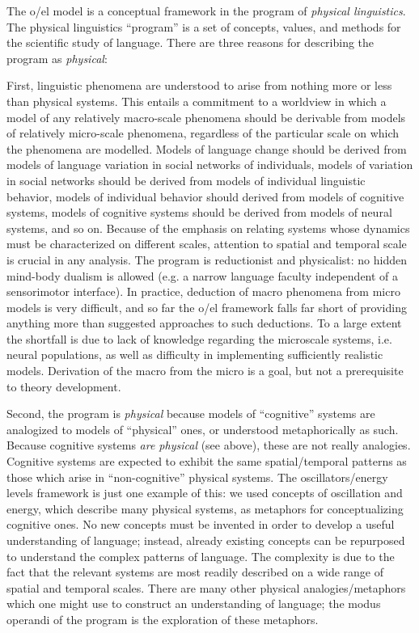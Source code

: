 The o/el model is a conceptual framework in the program of \textit{physical linguistics}. The physical linguistics “program” is a set of concepts, values, and methods for the scientific study of language. There are three reasons for describing the program as \textit{physical}: 

  First, linguistic phenomena are understood to arise from nothing more or less than physical systems. This entails a commitment to a worldview in which a model of any relatively macro-scale phenomena should be derivable from models of relatively micro-scale phenomena, regardless of the particular scale on which the phenomena are modelled. Models of language change should be derived from models of language variation in social networks of individuals, models of variation in social networks should be derived from models of individual linguistic behavior, models of individual behavior should derived from models of cognitive systems, models of cognitive systems should be derived from models of neural systems, and so on. Because of the emphasis on relating systems whose dynamics must be characterized on different scales, attention to spatial and temporal scale is crucial in any analysis. The program is reductionist and physicalist: no hidden mind-body dualism is allowed (e.g. a narrow language faculty independent of a sensorimotor interface). In practice, deduction of macro phenomena from micro models is very difficult, and so far the o/el framework falls far short of providing anything more than suggested approaches to such deductions. To a large extent the shortfall is due to lack of knowledge regarding the microscale systems, i.e. neural populations, as well as difficulty in implementing sufficiently realistic models. Derivation of the macro from the micro is a goal, but not a prerequisite to theory development.

  Second, the program is \textit{physical} because models of “cognitive” systems are analogized to models of “physical” ones, or understood metaphorically as such. Because cognitive systems \textit{are physical} (see above), these are not really analogies. Cognitive systems are expected to exhibit the same spatial/temporal patterns as those which arise in “non-cognitive” physical systems. The oscillators/energy levels framework is just one example of this: we used concepts of oscillation and energy, which describe many physical systems, as metaphors for conceptualizing cognitive ones. No new concepts must be invented in order to develop a useful understanding of language; instead, already existing concepts can be repurposed to understand the complex patterns of language. The complexity is due to the fact that the relevant systems are most readily described on a wide range of spatial and temporal scales. There are many other physical analogies/metaphors which one might use to construct an understanding of language; the modus operandi of the program is the exploration of these metaphors.

